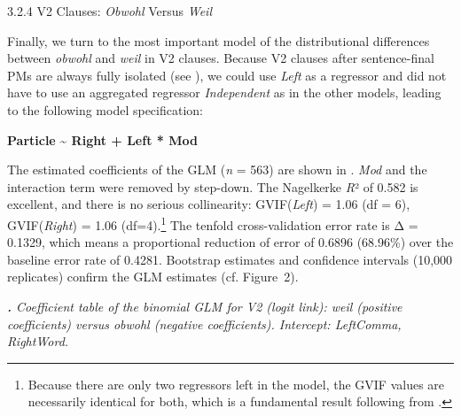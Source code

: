 \begin{styleMoutonHeadingii}
3.2.4  V2 Clauses: \textit{Obwohl} Versus \textit{Weil}
\end{styleMoutonHeadingii}

\begin{styleMoutonTextBeforeExample}
Finally, we turn to the most important model of the distributional differences between \textit{obwohl} and \textit{weil} in V2 clauses. Because V2 clauses after sentence-final PMs are always fully isolated (see ), we could use \textit{Left} as a regressor and did not have to use an aggregated regressor \textit{Independent} as in the other models, leading to the following model specification:
\end{styleMoutonTextBeforeExample}

\begin{styleMoutonText}
\textbf{Particle} \textbf{{\textasciitilde} Right + Left * Mod}
\end{styleMoutonText}

\begin{styleMoutonTextAfterExample}
The estimated coefficients of the GLM (\textit{n} = 563) are shown in . \textit{Mod} and the interaction term were removed by step-down. The Nagelkerke \textit{R}² of 0.582 is excellent, and there is no serious collinearity: GVIF(\textit{Left}) = 1.06 (df = 6), GVIF(\textit{Right}) = 1.06 (df=4).\footnote{Because there are only two regressors left in the model, the GVIF values are necessarily identical for both, which is a fundamental result following from \citet{FoxMonette1992}.} The tenfold cross-validation error rate is Δ = 0.1329, which means a proportional reduction of error of 0.6896 (68.96\%) over the baseline error rate of 0.4281. Bootstrap estimates and confidence intervals (10,000 replicates) confirm the GLM estimates (cf. Figure~2).
\end{styleMoutonTextAfterExample}

\begin{styleMoutonCaption}\itshape
\textbf{.} Coefficient table of the binomial GLM for V2 (logit link): weil (positive coefficients) versus obwohl (negative coefficients). Intercept: LeftComma, RightWord.
\end{styleMoutonCaption}

\tablefirsthead{}

